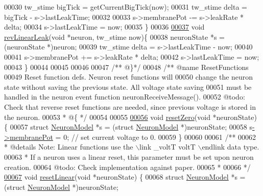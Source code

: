 \begin{DoxyCode}
00030     tw\_stime bigTick = getCurrentBigTick(now);
00031     tw\_stime delta = bigTick - s->lastLeakTime;
00032 
00033     s->membranePot -= s->leakRate * delta;
00034     s->lastLeakTime = now;
00035 \}
00036 
\hypertarget{neuron_8c_source_l00037}{}\hyperlink{neuron_8h_a26ced40d7ad7a0b448a136d8724fe18b}{00037} \textcolor{keywordtype}{void} \hyperlink{neuron_8h_a26ced40d7ad7a0b448a136d8724fe18b}{revLinearLeak}(\textcolor{keywordtype}{void} *neuron, tw\_stime now)\{
00038     neuronState *s = (neuronState *)neuron;
00039     tw\_stime delta = s->lastLeakTime - now;
00040 
00041     s->membranePot += s->leakRate * delta;
00042     s->lastLeakTime = now;
00043 \}
00044 
00045 
00046 
00047 \textcolor{comment}{/** @\}*/}
00048 \textcolor{comment}{/** @name ResetFunctions  }
00049 \textcolor{comment}{ Reset function defs. Neuron reset functions will}
00050 \textcolor{comment}{ change the neuron state without saving the previous state. All voltage state saving}
00051 \textcolor{comment}{ must be handled in the neuron event function neuronReceiveMessage(). }
00052 \textcolor{comment}{ @todo: Check that reverse reset functions are needed, since previous voltage is stored in the neuron.}
00053 \textcolor{comment}{ * @\{ */}
00054 
00055 
\hypertarget{neuron_8c_source_l00056}{}\hyperlink{neuron_8h_a7f8eaa35f03747c795a2b727b364537b}{00056} \textcolor{keywordtype}{void} \hyperlink{neuron_8h_a7f8eaa35f03747c795a2b727b364537b}{resetZero}(\textcolor{keywordtype}{void} *neuronState) \{
00057     \textcolor{keyword}{struct} \hyperlink{structneuron_state}{NeuronModel} *s = (\textcolor{keyword}{struct} \hyperlink{structneuron_state}{NeuronModel} *)neuronState;
00058     s\hyperlink{structneuron_state_a0fdd8f44c4105a94e17c4c58a51db486}{->}\hyperlink{structneuron_state_a0fdd8f44c4105a94e17c4c58a51db486}{membranePot} = 0; \textcolor{comment}{// set current voltage to 0.}
00059 \}
00060 
00061 \textcolor{comment}{/**}
00062 \textcolor{comment}{ *  @details  Note: Linear functions use the \(\backslash\)link \_voltT voltT \(\backslash\)endlink data type.}
00063 \textcolor{comment}{ *  If a neuron uses a linear reset, this parameter must be set upon neuron creation. }
00064 \textcolor{comment}{ @todo: Check implementation against paper.}
00065 \textcolor{comment}{ *}
00066 \textcolor{comment}{ */}
\hypertarget{neuron_8c_source_l00067}{}\hyperlink{neuron_8h_a2e78d7d2b70bf7349c3854b3727dcc25}{00067} \textcolor{keywordtype}{void} \hyperlink{neuron_8h_a2e78d7d2b70bf7349c3854b3727dcc25}{resetLinear}(\textcolor{keywordtype}{void} *neuronState) \{
00068     \textcolor{keyword}{struct} \hyperlink{structneuron_state}{NeuronModel} *s = (\textcolor{keyword}{struct} \hyperlink{structneuron_state}{NeuronModel} *)neuronState;

\end{DoxyCode}
